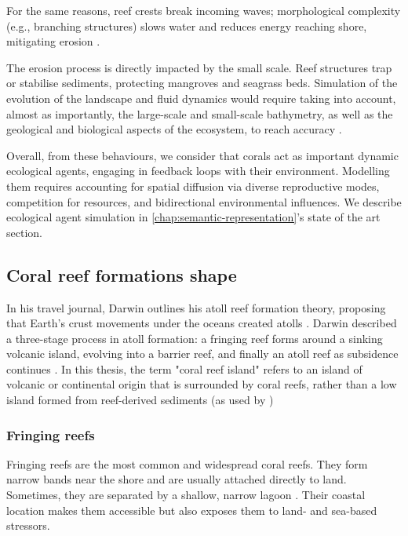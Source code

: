 For the same reasons, reef crests break incoming waves; morphological complexity (e.g., branching structures) slows water and reduces energy reaching shore, mitigating erosion \cite{Woodroffe2003}.

The erosion process is directly impacted by the small scale. Reef structures trap or stabilise sediments, protecting mangroves and seagrass beds. Simulation of the evolution of the landscape and fluid dynamics would require taking into account, almost as importantly, the large-scale and small-scale bathymetry, as well as the geological and biological aspects of the ecosystem, to reach accuracy \cite{Chevalier2017,Chevalier2015a}.

Overall, from these behaviours, we consider that corals act as important dynamic ecological agents, engaging in feedback loops with their environment. Modelling them requires accounting for spatial diffusion via diverse reproductive modes, competition for resources, and bidirectional environmental influences. We describe ecological agent simulation in \cref{chap:semantic-representation}'s state of the art section.


\subsection{Coral reef formations shape}
In his travel journal, Darwin outlines his atoll reef formation theory, proposing that Earth's crust movements under the oceans created atolls \cite{Darwin1842}. Darwin described a three-stage process in atoll formation: a fringing reef forms around a sinking volcanic island, evolving into a barrier reef, and finally an atoll reef as subsidence continues \cite{Hopley2014}. In this thesis, the term "coral reef island" refers to an island of volcanic or continental origin that is surrounded by coral reefs, rather than a low island formed from reef-derived sediments (as used by \cite{Masselink2020})

\subsubsection{Fringing reefs}
Fringing reefs are the most common and widespread coral reefs. They form narrow bands near the shore and are usually attached directly to land. Sometimes, they are separated by a shallow, narrow lagoon \cite{Kovacs2020}. Their coastal location makes them accessible but also exposes them to land- and sea-based stressors.

